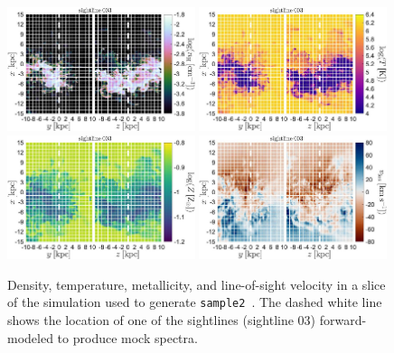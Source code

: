 \documentclass[fleqn,usenatbib]{mnras}
\begin{document}
\begin{figure}
    \centering
    \includegraphics[width=0.49\textwidth]{figures/sample2/projections/density_projection_maps_SL_03.jpg}
    \includegraphics[width=0.49\textwidth]{figures/sample2/projections/temperature_projection_maps_SL_03.jpg} \\
    \includegraphics[width=0.49\textwidth]{figures/sample2/projections/metallicity_projection_maps_SL_03.jpg}
    \includegraphics[width=0.49\textwidth]{figures/sample2/projections/velocity_projection_maps_SL_03.jpg}
    \caption{
    Density, temperature, metallicity, and line-of-sight velocity in a slice of the simulation used to generate \texttt{sample2}~\citep{mandelker2020Instability}.
    The dashed white line shows the location of one of the sightlines (sightline 03) forward-modeled to produce mock spectra.
    }
    \label{f: sample2 ray 03}
\end{figure}
\end{document}
